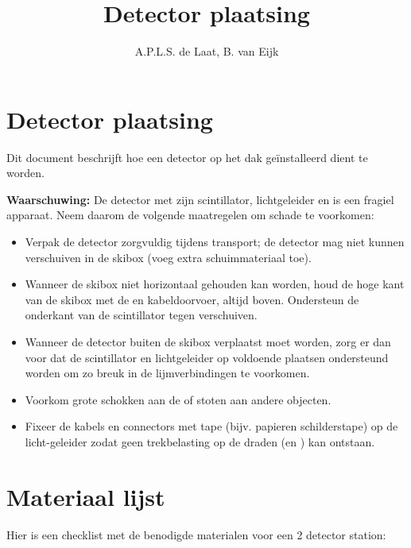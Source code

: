 

\title{Detector plaatsing}
\author{A.P.L.S. de Laat, B. van Eijk} 



\maketitle

\section{Detector plaatsing}

Dit document beschrijft hoe een \hisparc detector op het dak
geïnstalleerd dient te worden.

\textbf{Waarschuwing:} De \hisparc detector met zijn scintillator,
lichtgeleider en \pmt is een fragiel apparaat. Neem daarom de volgende
maatregelen om schade te voorkomen:

\begin{itemize}
    \item Verpak de detector zorgvuldig tijdens transport; de detector
    mag niet kunnen verschuiven in de skibox (voeg extra
    schuimmateriaal toe).
    \item Wanneer de skibox niet horizontaal gehouden kan worden, houd
    de hoge kant van de skibox met de \pmt en kabeldoorvoer, altijd
    boven. Ondersteun de onderkant van de scintillator tegen verschuiven.
    \item Wanneer de detector buiten de skibox verplaatst moet worden,
    zorg er dan voor dat de scintillator en lichtgeleider op voldoende
    plaatsen ondersteund worden om zo breuk in de lijmverbindingen te
    voorkomen.
    \item Voorkom grote schokken aan de \pmt of stoten aan andere
    objecten.
    \item Fixeer de \pmt kabels en connectors met tape (bijv. papieren
    schilderstape) op de licht-geleider zodat geen trekbelasting op de
    draden (en \pmt) kan ontstaan.
\end{itemize}


\section{Materiaal lijst}

Hier is een checklist met de benodigde materialen voor een 2 detector
station:

